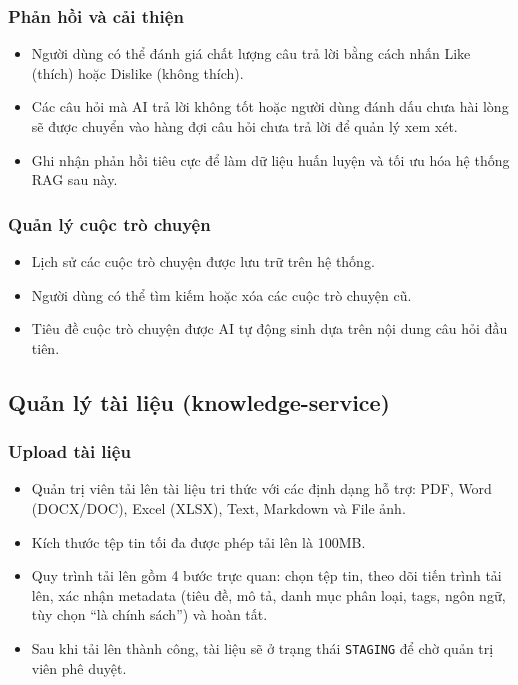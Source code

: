 \documentclass[12pt,a4paper]{report}
\begin{document}
\subsubsection{Phản hồi và cải thiện}
\begin{itemize}
    \item Người dùng có thể đánh giá chất lượng câu trả lời bằng cách nhấn Like (thích) hoặc Dislike (không thích).
    \item Các câu hỏi mà AI trả lời không tốt hoặc người dùng đánh dấu chưa hài lòng sẽ được chuyển vào hàng đợi câu hỏi chưa trả lời để quản lý xem xét.
    \item Ghi nhận phản hồi tiêu cực để làm dữ liệu huấn luyện và tối ưu hóa hệ thống RAG sau này.
\end{itemize}

\subsubsection{Quản lý cuộc trò chuyện}
\begin{itemize}
    \item Lịch sử các cuộc trò chuyện được lưu trữ trên hệ thống.
    \item Người dùng có thể tìm kiếm hoặc xóa các cuộc trò chuyện cũ.
    \item Tiêu đề cuộc trò chuyện được AI tự động sinh dựa trên nội dung câu hỏi đầu tiên.
\end{itemize}

\subsection{Quản lý tài liệu (knowledge-service)}

\subsubsection{Upload tài liệu}
\begin{itemize}
    \item Quản trị viên tải lên tài liệu tri thức với các định dạng hỗ trợ: PDF, Word (DOCX/DOC), Excel (XLSX), Text, Markdown và File ảnh.
    \item Kích thước tệp tin tối đa được phép tải lên là 100MB.
    \item Quy trình tải lên gồm 4 bước trực quan: chọn tệp tin, theo dõi tiến trình tải lên, xác nhận metadata (tiêu đề, mô tả, danh mục phân loại, tags, ngôn ngữ, tùy chọn ``là chính sách'') và hoàn tất.
    \item Sau khi tải lên thành công, tài liệu sẽ ở trạng thái \texttt{STAGING} để chờ quản trị viên phê duyệt.
\end{itemize}
\end{document}
